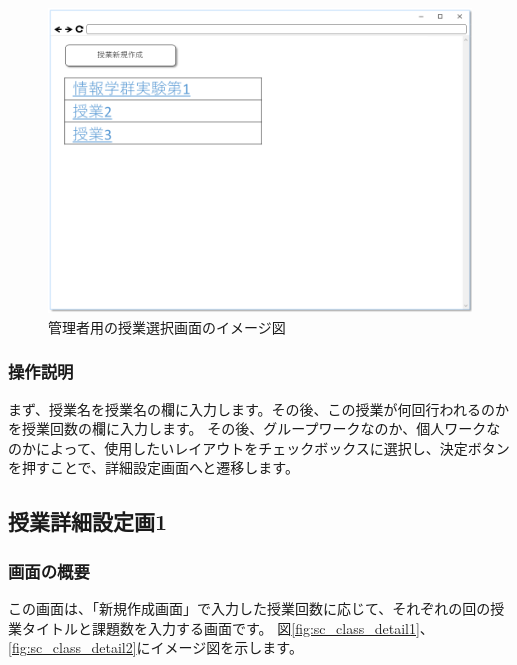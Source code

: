\begin{figure}[htbp]
  \begin{center}
    \includegraphics[width=1\linewidth,clip]{./img/sc_select_class.png}
    \caption{管理者用の授業選択画面のイメージ図}\label{fig:sc_select_class}
  \end{center}
\end{figure}

\subsubsection{操作説明}
まず、授業名を授業名の欄に入力します。その後、この授業が何回行われるのかを授業回数の欄に入力します。
その後、グループワークなのか、個人ワークなのかによって、使用したいレイアウトをチェックボックスに選択し、決定ボタンを押すことで、詳細設定画面へと遷移します。

\newpage

\subsection{授業詳細設定画1}
\subsubsection{画面の概要}
この画面は、「新規作成画面」で入力した授業回数に応じて、それぞれの回の授業タイトルと課題数を入力する画面です。
図\ref{fig:sc_class_detail1}、\ref{fig:sc_class_detail2}にイメージ図を示します。

